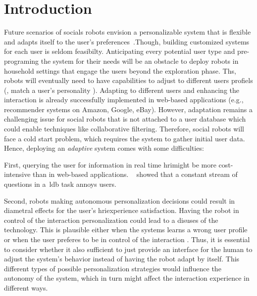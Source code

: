 \documentclass[twocolumn]{svjour3}          %
\begin{document}
\def\spacingset#1{\renewcommand{\baselinestretch}%
{#1}\small\normalsize} \spacingset{1}


\hypertarget{introduction}{%
\section{Introduction}\label{introduction}}

Future scenarios of socials robots envision a personalizable system that
is flexible and adapts itself to the user's preferences~\autocite{leite}.Though, building customized systems for each user is seldom feasibilty. Anticipating every potential user type and pre-programing the system for their needs will be an obstacle to deploy robots in household settings that engage the users beyond the exploration phase. Ths, robots will eventually need to have capabilities to adjust to different users profiels (\eg{}, match a user's personality \autocite{andrist2015look}). Adapting to different users and enhancing the interaction is already successfully implemented in web-based applications (e.g., recommender systems on Amazon, Google, eBay). However, adaptation remains a challenging issue for social robots
that is not attached to a user database which could enable techniques like collaborative filtering. Therefore, social robots will face a cold start problem, which requires the system to gather initial user data. Hence, deploying an \textit{adaptive} system comes with some difficulties:

First, querying the user for information in real time \gls{hri}might be more
cost-intensive than in web-based applications. ~\textcite{cakmak2010designing} showed that a constant stream of questions in a~\gls{ldb} task annoys users.

Second, robots making autonomous personalization
decisions could result in diametral effects for the user's \gls{hri}experience satisfaction. Having the robot in control of the interaction personalization could lead to a disuses of the technology. This is plausible either when the systems learns a wrong user profile or when the user preferes to be in control of the interaction \cite{burger2013desire}. Thus, it is essential to consider whether it also sufficient to just provide an interface for the human to adjust the system's behavior instead of having the robot adapt by itself.
This different types of possible personalization strategies would influence the autonomy of the
system, which in turn might affect the interaction experience in different ways.
\end{document}
